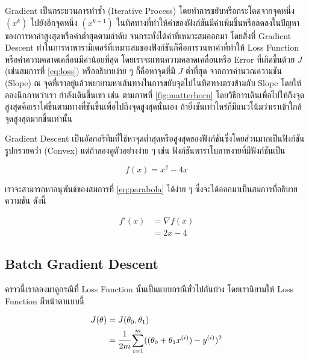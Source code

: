 Gradient เป็นกระบวนการทำซ้ำ (Iterative Process) โดยทําการขยับหรือกระโดดจากจุดหนึ่ง $(x^{k})$ ไปยังอีกจุดหนึ่ง $(x^{k+1})$
ในทิศทางที่ทําให้ค่าของฟังก์ชันมีค่าเพิ่มขึ้นหรือลดลงในปัญหาของการหาค่าสูงสุดหรือค่าต่ำสุดตามลำดับ จนกระทั่งได้ค่าที่เหมาะสมออกมา โดยสิ่งที่
Gradient Descent ทำในการหาพารามิเตอร์ที่เหมาะสมของฟังก์ชันก็คือการวนหาค่าที่ทำให้ Loss Function หรือค่าความคลาดเคลื่อนมีค่าน้อยที่สุด
โดยเราจะแทนความคลาดเคลื่อนหรือ Error ที่เกิดขึ้นด้วย $J$ (เช่นสมการที่ \eqref{eq:loss}) หรืออธิบายง่าย ๆ ก็คือหาจุดที่มี $J$ ต่ำที่สุด%
จากการคำนวณความชัน (Slope) ณ จุดที่เราอยู่แล้วพยายามหาเส้นทางในการขยับจุดไปในทิศทางตรงข้ามกับ Slope โดยให้ลองนึกภาพว่าเรา%
กำลังเดินขึ้นเขา เช่น ตามภาพที่ \ref{fig:matterhorn} โดยวิธีการเดินเพื่อไปให้ถึงจุดสูงสุดคือเราไต่ขึ้นตามทางที่ชันขึ้นเพื่อไปถึงจุดสูงสุดนั่นเอง
ถ้ายิ่งชันเท่าไหร่ก็มีแนวโน้มว่าเราเข้าใกล้จุดสูงสุดมากขึ้นเท่านั้น

Gradient Descent เป็นอัลกอริทึมที่ใช้หาจุดต่ำสุดหรือสูงสุดของฟังก์ชันซึ่งโดยส่วนมากเป็นฟังก์ชันรูปกรวยคว่ำ (Convex) แต่ถ้าลองดูตัวอย่างง่าย ๆ
เช่น ฟังก์ชันพาราโบลาหงายที่มีฟังก์ชันเป็น

\begin{equation}\label{eq:parabola}
    f(x) = x^2 - 4x
\end{equation}

\noindent เราจะสามารถหาอนุพันธ์ของสมการที่ \eqref{eq:parabola} ได้ง่าย ๆ ซึ่งจะได้ออกมาเป็นสมการที่อธิบายความชัน ดังนี้

\begin{align}\label{eq:parabola_slope}
    f'(x) & = \nabla f(x) \nonumber \\
          & = 2x - 4
\end{align}

\subsection{Batch Gradient Descent}
\label{ssec:batch_grad}

คราวนี้เราลองมาดูกรณีที่ Loss Function นั้นเป็นแบบกรณีทั่วไปกันบ้าง โดยเรานิยามให้ Loss Function มีหน้าตาแบบนี้

\begin{align}\label{eq:batch_loss}
    J(\theta) & = J(\theta_0, \theta_1) \nonumber                                        \\
              & = \cfrac{1}{2m} \sum_{i=1}^m ((\theta_0 + \theta_1 x^{(i)}) - y^{(i)})^2
\end{align}

